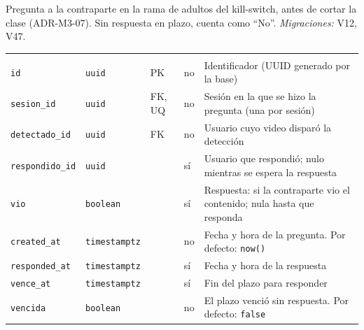 Pregunta a la contraparte en la rama de adultos del kill-switch, antes de cortar la clase (ADR-M3-07). Sin respuesta en plazo, cuenta como ``No''. \emph{Migraciones:} V12, V47.

{\small
\begin{xltabular}{\textwidth}{@{}>{\raggedright\arraybackslash}p{3.6cm} >{\raggedright\arraybackslash}p{2.3cm} >{\raggedright\arraybackslash}p{1cm} >{\centering\arraybackslash}p{0.85cm} L@{}}
    \toprule
     &  &  &  &  \\
    \midrule
    \endfirsthead
    \toprule
     &  &  &  &  \\
    \midrule
    \endhead
    \bottomrule
    \endfoot
    \texttt{id} & \texttt{uuid} & PK & no & Identificador (UUID generado por la base) \\
    \texttt{sesion\_\allowbreak{}id} & \texttt{uuid} & FK, UQ & no & Sesión en la que se hizo la pregunta (una por sesión) \\
    \texttt{detectado\_\allowbreak{}id} & \texttt{uuid} & FK & no & Usuario cuyo video disparó la detección \\
    \texttt{respondido\_\allowbreak{}id} & \texttt{uuid} &  & sí & Usuario que respondió; nulo mientras se espera la respuesta \\
    \texttt{vio} & \texttt{boolean} &  & sí & Respuesta: si la contraparte vio el contenido; nula hasta que responda \\
    \texttt{created\_\allowbreak{}at} & \texttt{timestamptz} &  & no & Fecha y hora de la pregunta. Por defecto: \texttt{now(\allowbreak{})} \\
    \texttt{responded\_\allowbreak{}at} & \texttt{timestamptz} &  & sí & Fecha y hora de la respuesta \\
    \texttt{vence\_\allowbreak{}at} & \texttt{timestamptz} &  & sí & Fin del plazo para responder \\
    \texttt{vencida} & \texttt{boolean} &  & no & El plazo venció sin respuesta. Por defecto: \texttt{false} \\
\end{xltabular}
}

